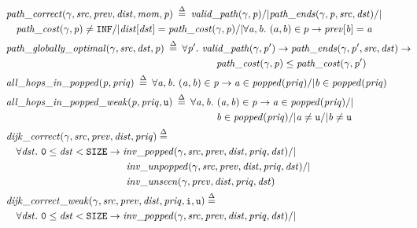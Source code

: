 \begin{figure}
\begin{equation*}
\begin{split}
&\!\!\!\!\!\!\m{path\_correct}(\gamma, \m{src}, \m{prev}, \m{dist}, \m{mom}, \m{p}) \; \defeq \; 
\m{valid\_path}(\gamma, \m{p}) /| \m{path\_ends}(\gamma, \m{p}, \m{src}, \m{dst}) /| \null \\
&\m{path\_cost}(\gamma, \m{p}) \not= \texttt{INF} /| \m{dist}[\m{dst}] = \m{path\_cost}(\gamma, \m{p}) /| \forall \m{a, b}.~\m(a,b) \in p -> \m{prev}[\m{b}] = \m{a} \\
\vspace{2em}
&\!\!\!\!\!\!\m{path\_globally\_optimal}(\gamma, \m{src}, \m{dst}, \m{p}) \; \defeq \; 
\forall \m{p'}.~\m{valid\_path}(\gamma, \m{p'}) -> \m{path\_ends}(\gamma, \m{p'}, \m{src}, \m{dst}) -> \\
&\hspace{20em}\m{path\_cost}(\gamma, \m{p}) \le \m{path\_cost}(\gamma, \m{p'}) \\
&\!\!\!\!\!\!\m{all\_hops\_in\_popped}(\m{p}, \m{priq}) \; \defeq \; 
\forall \m{a, b}.~\m{(a, b)} \in \m{p} -> \m{a} \in \m{popped}(\m{priq}) /| \m{b} \in \m{popped}(\m{priq})\\
&\!\!\!\!\!\!\m{all\_hops\_in\_popped\_weak}(\m{p}, \m{priq}, \texttt{u}) \; \defeq \; 
\forall \m{a, b}.~\m{(a, b)} \in \m{p} -> \m{a} \in \m{popped}(\m{priq}) /| \null \\ 
&\hspace{20em}\m{b} \in \m{popped}(\m{priq}) /| \m{a} \not= \texttt{u} /| \m{b} \not= \texttt{u} \\
\vspace{4em}
&\!\!\!\!\!\!\m{dijk\_correct}(\gamma, \m{src}, \m{prev}, \m{dist}, \m{priq}) \; \defeq \; \\
&\forall \m{dst}.~\texttt{0} \le \m{dst} < \texttt{SIZE} -> \m{inv\_popped}(\gamma, \m{src}, \m{prev}, \m{dist}, \m{priq}, \m{dst}) /| \null \\
&\hspace{11em}\m{inv\_unpopped}(\gamma, \m{src}, \m{prev}, \m{dist}, \m{priq}, \m{dst}) /| \null \\
&\hspace{11em}\m{inv\_unseen}(\gamma, \m{prev}, \m{dist}, \m{priq}, \m{dst}) \\
\vspace{1em}
&\!\!\!\!\!\!\m{dijk\_correct\_weak}(\gamma, \m{src}, \m{prev}, \m{dist}, \m{priq}, \texttt{i}, \texttt{u}) \; \defeq \; \\
&\forall \m{dst}.~\texttt{0} \le \m{dst} < \texttt{SIZE} -> \m{inv\_popped}(\gamma, \m{src}, \m{prev}, \m{dist}, \m{priq}, \m{dst}) /| \null \\

\end{split}
\end{equation*}
\end{figure}
